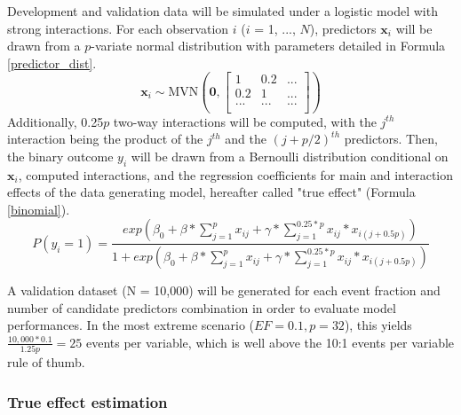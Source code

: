 \documentclass{article}
\begin{document}
Development and validation data will be simulated under a logistic model with strong interactions. For each observation $i$ ($i$ = 1, ..., $N$), predictors $\mathbf{x}_i$ will be drawn from a $p$-variate normal distribution with parameters detailed in Formula \ref{predictor_dist}.\begin{equation}
    \mathbf{x}_i \sim \text{MVN}(\mathbf{0}, \left[ {\begin{array}{ccc}
    1 & 0.2 & ... \\
    0.2 & 1 & ... \\
    ... & ... & ...\\
  \end{array} } \right])
  \label{predictor_dist}
\end{equation}
Additionally, 0.25$p$ two-way interactions will be computed, with the $j^{th}$ interaction being the product of the $j^{th}$ and the $(j+p/2)^{th}$ predictors.
Then, the binary outcome $y_i$ will be drawn from a Bernoulli distribution conditional on $\mathbf{x}_i$, computed interactions, and the regression coefficients for main and interaction effects of the data generating model, hereafter called "true effect" (Formula \ref{binomial}).\begin{equation}
    P(y_i = 1) = \frac{exp(\beta_0 + \beta*\sum_{j=1}^px_{ij} + \gamma*\sum_{j=1}^{0.25*p}x_{ij}*x_{i(j+0.5p)})}{1 + exp(\beta_0 + \beta*\sum_{j=1}^px_{ij} + \gamma*\sum_{j=1}^{0.25*p}x_{ij}*x_{i(j+0.5p)})}
    \label{binomial}
\end{equation}

A validation dataset (N = 10,000) will be generated for each event fraction and number of candidate predictors combination in order to evaluate model performances. In the most extreme scenario ($EF = 0.1, p = 32$), this yields $\frac{10,000*0.1}{1.25p} = 25$ events per variable, which is well above the 10:1 events per variable rule of thumb.

\subsubsection{True effect estimation}
\end{document}
